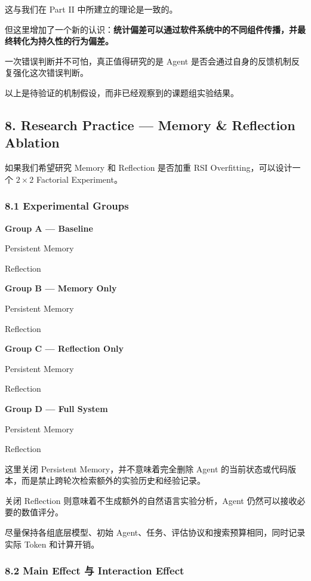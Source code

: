 这与我们在 Part II 中所建立的理论是一致的。

但这里增加了一个新的认识：\textbf{统计偏差可以通过软件系统中的不同组件传播，并最终转化为持久性的行为偏差。}

一次错误判断并不可怕，真正值得研究的是 Agent 是否会通过自身的反馈机制反复强化这次错误判断。

以上是待验证的机制假设，而非已经观察到的课题组实验结果。

\hypertarget{part-3-34-0001-research-practice-memory-reflection-ablation}{%
\subsection{8. Research Practice --- Memory \& Reflection Ablation}\label{part-3-34-0001-research-practice-memory-reflection-ablation}}

如果我们希望研究 Memory 和 Reflection 是否加重 RSI Overfitting，可以设计一个 \(2\times2\) Factorial Experiment。

\hypertarget{part-3-34-0001-experimental-groups}{%
\subsubsection{8.1 Experimental Groups}\label{part-3-34-0001-experimental-groups}}

\textbf{Group A --- Baseline}

Persistent Memory

Reflection

\textbf{Group B --- Memory Only}

Persistent Memory

Reflection

\textbf{Group C --- Reflection Only}

Persistent Memory

Reflection

\textbf{Group D --- Full System}

Persistent Memory

Reflection

这里关闭 Persistent Memory，并不意味着完全删除 Agent 的当前状态或代码版本，而是禁止跨轮次检索额外的实验历史和经验记录。

关闭 Reflection 则意味着不生成额外的自然语言实验分析，Agent 仍然可以接收必要的数值评分。

尽量保持各组底层模型、初始 Agent、任务、评估协议和搜索预算相同，同时记录实际 Token 和计算开销。

\hypertarget{part-3-34-0001-main-effect-ux4e0e-interaction-effect}{%
\subsubsection{8.2 Main Effect 与 Interaction Effect}\label{part-3-34-0001-main-effect-ux4e0e-interaction-effect}}

